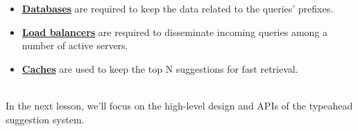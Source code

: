 \begin{itemize}
\item
\protect{}\label{ZiEmogSgTKwNPNLPTwuGT}
\href{https://www.educative.io/courses/grokking-the-system-design-interview/introduction-to-databases}{\textbf{Databases}} are required to keep the data related to the queries' prefixes.
\item
\protect{}\label{UPKN1bMSVxPNqvRZopp33}
\href{https://www.educative.io/courses/grokking-the-system-design-interview/introduction-to-load-balancers}{\textbf{Load balancers}} are required to disseminate incoming queries among a number of active servers.
\item
\protect{}\label{Kz6n-yHEKuNk2TsDvW5Jv}
\href{https://www.educative.io/courses/grokking-the-system-design-interview/system-design-the-distributed-cache}{\textbf{Caches}} are used to keep the top N suggestions for fast retrieval.
\end{itemize}
\\
In the next lesson, we'll focus on the high-level design and APIs of the typeahead suggestion system.


